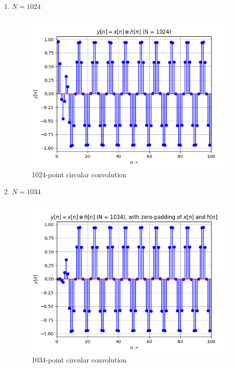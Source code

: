 \documentclass[12pt, a4paper, twoside]{article}
\begin{document}
\begin{enumerate}[label= \texttt{Case (\alph*)}]
    \item $N = 1024$
    \begin{figure}[H]
        \centering
        \includegraphics[scale=0.5]{Fig4.png}
        \caption{1024-point circular convolution}
        \label{fig:Fig4}
    \end{figure}
    \item $N = 1034$
    \begin{figure}[H]
        \centering
        \includegraphics[scale=0.5]{Fig5.png}
        \caption{1034-point circular convolution}
        \label{fig:Fig4}
    \end{figure}
\end{enumerate}
\end{document}
